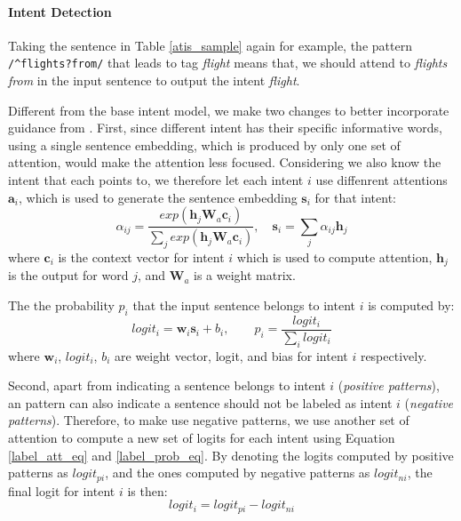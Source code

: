\paragraph{Intent Detection}
Taking the sentence in Table \ref{atis_sample} again for example, the pattern \texttt{/\textasciicircum flights?\:from/} that leads to tag \emph{flight} means that, we should attend to \emph{flights from} in the input sentence to output the intent \emph{flight}. 

Different from the base intent model, we make two changes to better incorporate guidance from \RE.
First, since different intent has their specific informative words, using a single sentence embedding, which is produced by only one set of attention, would make the attention less focused. 
Considering we also know the intent that each \RE points to, we therefore let each intent $i$ use diffenrent attentions $\textbf{a}_i$, which is used to generate the sentence embedding $\textbf{s}_i$ for that intent:
\begin{equation}
\alpha_{ij}=\frac{exp(\textbf{h}_j\textbf{W}_a\textbf{c}_i)}{\sum_{j}{exp(\textbf{h}_j\textbf{W}_a\textbf{c}_i)}}, \quad
\textbf{s}_i = \sum_{j}{\alpha_{ij}\textbf{h}_j}
\label{label_att_eq}
\end{equation}
where $\textbf{c}_i$ is the context vector for intent $i$ which is used to compute attention, $\textbf{h}_j$ is the \BLSTM output for word $j$, and $\textbf{W}_a$ is a weight matrix.

The the probability $p_i$ that the input sentence belongs to intent $i$ is computed by:
\begin{equation}
logit_i=\textbf{w}_i\textbf{s}_i + b_i, \quad\quad p_i = \frac{logit_i}{\sum_{i}{logit_i}}
\label{label_prob_eq}
\end{equation}
where $\textbf{w}_i$, $logit_i$, $b_i$ are weight vector, logit, and bias for intent $i$ respectively.

Second, apart from indicating a sentence belongs to intent $i$ (\emph{positive patterns}), an \RE pattern can also indicate a sentence should not be labeled as intent $i$ (\emph{negative patterns}). Therefore, to make use negative patterns, we use another set of attention to compute a new set of logits for each intent using Equation \ref{label_att_eq} and \ref{label_prob_eq}. By denoting the logits computed by positive patterns as $logit_{pi}$, and the ones computed by negative patterns as $logit_{ni}$, the final logit for intent $i$ is then: 
\begin{equation}
logit_i = logit_{pi} - logit_{ni}
\end{equation}

